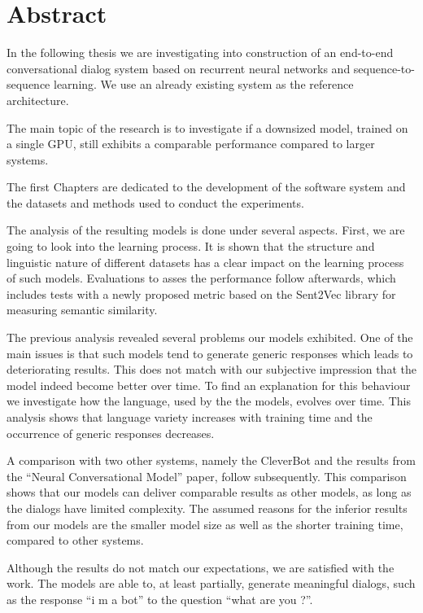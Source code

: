 \chapter*{Abstract}
In the following thesis we are investigating into construction of an end-to-end conversational dialog system based on recurrent neural networks and sequence-to-sequence learning. We use an already existing system as the reference architecture. 

The main topic of the research is to investigate if a downsized model, trained on a single GPU, still exhibits a comparable performance compared to larger systems.

The first Chapters are dedicated to the development of the software system and the datasets and methods used to conduct the experiments.

The analysis of the resulting models is done under several aspects. First, we are going to look into the learning process. It is shown that the structure and linguistic nature of different datasets has a clear impact on the learning process of such models. Evaluations to asses the performance follow afterwards, which includes tests with a newly proposed metric based on the Sent2Vec library for measuring semantic similarity.

The previous analysis revealed several problems our models exhibited. One of the main issues is that such models tend to generate generic responses which leads to deteriorating results. This does not match with our subjective impression that the model indeed become better over time. To find an explanation for this behaviour we investigate how the language, used by the the models, evolves over time. This analysis shows that language variety increases with training time and the occurrence of generic responses decreases.

A comparison with two other systems, namely the CleverBot and the results from the ``Neural Conversational Model'' paper, follow subsequently. This comparison shows that our models can deliver comparable results as other models, as long as the dialogs have limited complexity. The assumed reasons for the inferior results from our models are the smaller model size as well as the shorter training time, compared to other systems.

Although the results do not match our expectations, we are satisfied with the work. The models are able to, at least partially, generate meaningful dialogs, such as the response ``i m a bot'' to the question ``what are you ?''.

